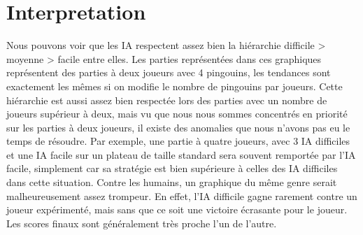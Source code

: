 \documentclass{report}
\begin{document}
\chapter{Interpretation}

Nous pouvons voir que les IA respectent assez bien la hiérarchie difficile > moyenne > facile entre elles. 
Les parties représentées dans ces graphiques représentent des parties à deux joueurs avec 4 pingouins, les tendances sont exactement les mêmes si on modifie le nombre de pingouins par joueurs.
Cette hiérarchie est aussi assez bien respectée lors des parties avec un nombre de joueurs supérieur à deux, mais vu que nous nous sommes concentrés en priorité sur les parties à deux joueurs, il existe des anomalies que nous n'avons pas eu le temps de résoudre.
\newline
Par exemple, une partie à quatre joueurs, avec 3 IA difficiles et une IA facile sur un plateau de taille standard sera souvent remportée par l'IA facile, simplement car sa stratégie est bien supérieure à celles des IA difficiles dans cette situation.
\newline
Contre les humains, un graphique du même genre serait malheureusement assez trompeur. En effet, l'IA difficile gagne rarement contre un joueur expérimenté, mais sans que ce soit une victoire écrasante pour le joueur. Les scores finaux sont généralement très proche l'un de l'autre.
\end{document}
